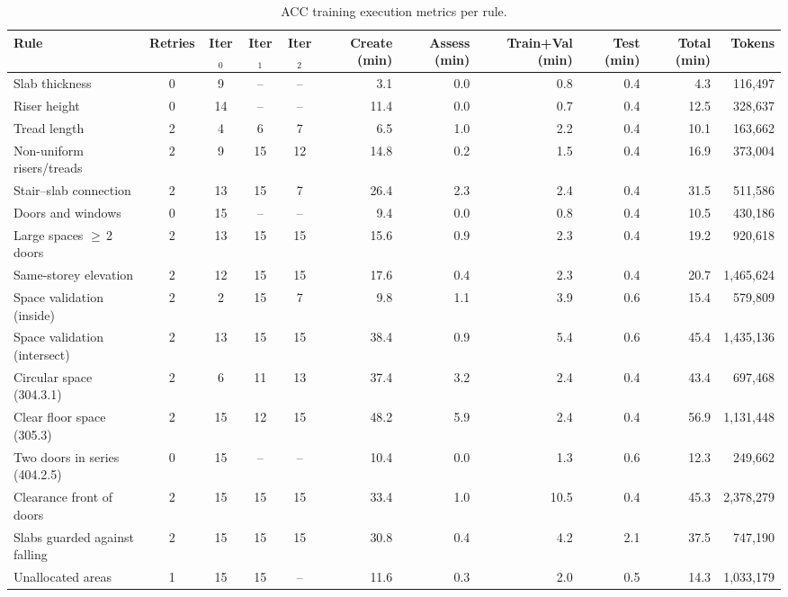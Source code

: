 \begin{table}[t]
\centering
\caption{ACC training execution metrics per rule.}
\label{tab:acc_execution}
\small
\begin{tabular}{l c c c c r r r r r r}
\toprule
Rule & Retries & Iter$_0$ & Iter$_1$ & Iter$_2$ & Create (min) & Assess (min) & Train+Val (min) & Test (min) & Total (min) & Tokens \\
\midrule
Slab thickness & 0 & 9 & -- & -- & 3.1 & 0.0 & 0.8 & 0.4 & 4.3 & 116,497 \\
Riser height & 0 & 14 & -- & -- & 11.4 & 0.0 & 0.7 & 0.4 & 12.5 & 328,637 \\
Tread length & 2 & 4 & 6 & 7 & 6.5 & 1.0 & 2.2 & 0.4 & 10.1 & 163,662 \\
\midrule
Non-uniform risers/treads & 2 & 9 & 15 & 12 & 14.8 & 0.2 & 1.5 & 0.4 & 16.9 & 373,004 \\
Stair--slab connection & 2 & 13 & 15 & 7 & 26.4 & 2.3 & 2.4 & 0.4 & 31.5 & 511,586 \\
Doors and windows & 0 & 15 & -- & -- & 9.4 & 0.0 & 0.8 & 0.4 & 10.5 & 430,186 \\
Large spaces $\geq$\,2 doors & 2 & 13 & 15 & 15 & 15.6 & 0.9 & 2.3 & 0.4 & 19.2 & 920,618 \\
Same-storey elevation & 2 & 12 & 15 & 15 & 17.6 & 0.4 & 2.3 & 0.4 & 20.7 & 1,465,624 \\
Space validation (inside) & 2 & 2 & 15 & 7 & 9.8 & 1.1 & 3.9 & 0.6 & 15.4 & 579,809 \\
Space validation (intersect) & 2 & 13 & 15 & 15 & 38.4 & 0.9 & 5.4 & 0.6 & 45.4 & 1,435,136 \\
\midrule
Circular space (304.3.1) & 2 & 6 & 11 & 13 & 37.4 & 3.2 & 2.4 & 0.4 & 43.4 & 697,468 \\
Clear floor space (305.3) & 2 & 15 & 12 & 15 & 48.2 & 5.9 & 2.4 & 0.4 & 56.9 & 1,131,448 \\
Two doors in series (404.2.5) & 0 & 15 & -- & -- & 10.4 & 0.0 & 1.3 & 0.6 & 12.3 & 249,662 \\
Clearance front of doors & 2 & 15 & 15 & 15 & 33.4 & 1.0 & 10.5 & 0.4 & 45.3 & 2,378,279 \\
Slabs guarded against falling & 2 & 15 & 15 & 15 & 30.8 & 0.4 & 4.2 & 2.1 & 37.5 & 747,190 \\
Unallocated areas & 1 & 15 & 15 & -- & 11.6 & 0.3 & 2.0 & 0.5 & 14.3 & 1,033,179 \\
\bottomrule
\end{tabular}
\end{table}